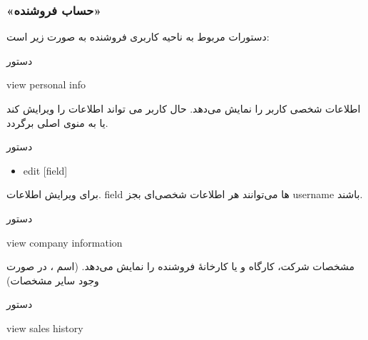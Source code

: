 \documentclass[]{article}
\begin{document}
\subsubsection*{{\titr «حساب فروشنده»}}

دستورات مربوط به ناحیه کاربری فروشنده به صورت زیر است:

\begin{mybox}[colback=yellow]{دستور}

\begin{latin}

view personal info

\end{latin}

\end{mybox}

اطلاعات شخصی کاربر را نمایش می‌دهد. حال کاربر می تواند اطلاعات را ویرایش کند یا به منوی اصلی برگردد.

\begin{mybox}[colback=brilliantlavender]{دستور}

\begin{latin}

\begin{itemize}[label = {$\Rightarrow$}]

\item
edit [field] 

\end{itemize}

\end{latin}

\end{mybox}

برای ویرایش اطلاعات. field ها می‌توانند هر اطلاعات شخصی‌ای بجز username باشند.

\hrulefill

\begin{mybox}[colback=yellow]{دستور}

\begin{latin}

view company information

\end{latin}

\end{mybox}

مشخصات شرکت، کارگاه و یا کارخانهٔ فروشنده را نمایش می‌دهد. (اسم ، در صورت وجود سایر مشخصات) 

\hrulefill

\begin{mybox}[colback=yellow]{دستور}

\begin{latin}

view sales history

\end{latin}

\end{mybox}
\end{document}
